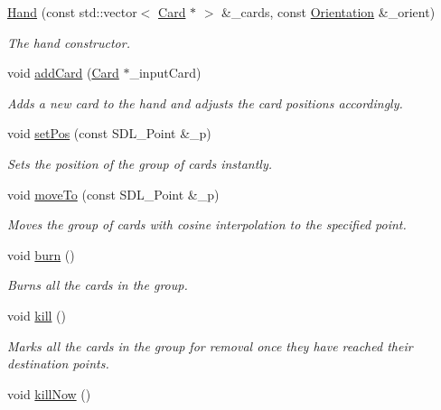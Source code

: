 \begin{DoxyCompactItemize}
\item 
\hyperlink{classGUI_1_1Hand_a0f0f7a43d2948a1e5cee66536e13ac63}{Hand} (const std\-::vector$<$ \hyperlink{classGUI_1_1Card}{Card} $\ast$ $>$ \&\-\_\-cards, const \hyperlink{namespaceGUI_a1a3a8094d47f7be06ce123fab38abf6a}{Orientation} \&\-\_\-orient)
\begin{DoxyCompactList}\small\item\em The hand constructor. \end{DoxyCompactList}\item 
void \hyperlink{classGUI_1_1Hand_aff80de64544b9dbb63cfb97a4f134fb3}{add\-Card} (\hyperlink{classGUI_1_1Card}{Card} $\ast$\-\_\-input\-Card)
\begin{DoxyCompactList}\small\item\em Adds a new card to the hand and adjusts the card positions accordingly. \end{DoxyCompactList}\item 
void \hyperlink{classGUI_1_1Hand_ae2eea148af3e5b3c0ec9a270236c5fd8}{set\-Pos} (const S\-D\-L\-\_\-\-Point \&\-\_\-p)
\begin{DoxyCompactList}\small\item\em Sets the position of the group of cards instantly. \end{DoxyCompactList}\item 
void \hyperlink{classGUI_1_1Hand_a53d11cad62abf839efa60e7138504296}{move\-To} (const S\-D\-L\-\_\-\-Point \&\-\_\-p)
\begin{DoxyCompactList}\small\item\em Moves the group of cards with cosine interpolation to the specified point. \end{DoxyCompactList}\item 
void \hyperlink{classGUI_1_1Hand_a45cb70719a992f756371263c8ecbac03}{burn} ()
\begin{DoxyCompactList}\small\item\em Burns all the cards in the group. \end{DoxyCompactList}\item 
void \hyperlink{classGUI_1_1Hand_a013a6b6119d78aea3f989243e826328d}{kill} ()
\begin{DoxyCompactList}\small\item\em Marks all the cards in the group for removal once they have reached their destination points. \end{DoxyCompactList}\item 
void \hyperlink{classGUI_1_1Hand_af921a7d8b5bb21a1eab8bc6f79ebb3c7}{kill\-Now} ()

\end{DoxyCompactItemize}
